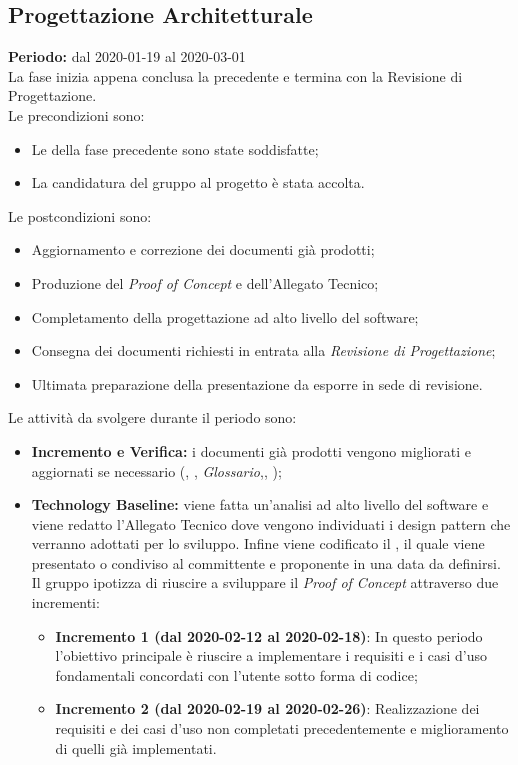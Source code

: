 \subsection{Progettazione Architetturale}
\label{progettazione_architetturale}
\textbf{Periodo:} dal 2020-01-19 al 2020-03-01
\\La fase inizia appena conclusa la precedente e termina con la Revisione di Progettazione.
\\Le precondizioni sono:

\begin{itemize}
    \item Le  della fase precedente sono state soddisfatte;
    \item La candidatura del gruppo al progetto {\NomeProgetto} è stata accolta.
\end{itemize}
    Le postcondizioni sono:
\begin{itemize}
    \item Aggiornamento e correzione dei documenti già prodotti;
    \item Produzione del \textit{Proof of Concept} e dell'Allegato Tecnico;
    \item Completamento della progettazione ad alto livello del software;
    \item Consegna dei documenti richiesti in entrata alla \textit{Revisione di Progettazione};
    \item Ultimata preparazione della presentazione da esporre in sede di revisione.
\end{itemize}

Le attività da svolgere durante il periodo sono:
\begin{itemize}
    \item \textbf{Incremento e Verifica:} i documenti già prodotti vengono migliorati e aggiornati se necessario (\textit{\NdP}, \textit{\PdP}, \textit{Glossario},\textit{\PdQ}, \textit{\AdR});
    \item \textbf{Technology Baseline:} viene fatta un'analisi ad alto livello del software e viene redatto l'Allegato Tecnico dove vengono individuati i design pattern che verranno adottati per lo sviluppo. Infine viene codificato il , il quale viene presentato o condiviso al committente e proponente in una data da definirsi. Il gruppo ipotizza di riuscire a sviluppare il {\textit{Proof of Concept}} attraverso due incrementi:
    \begin{itemize}
        \item \textbf{Incremento 1 (dal 2020-02-12 al 2020-02-18)}: In questo periodo l'obiettivo principale è riuscire a implementare i requisiti e i casi d'uso fondamentali concordati con l'utente sotto forma di codice;
        \item \textbf{Incremento 2 (dal 2020-02-19 al 2020-02-26)}: Realizzazione dei requisiti e dei casi d'uso non completati precedentemente e miglioramento di quelli già implementati.
    \end{itemize}
\end{itemize}

